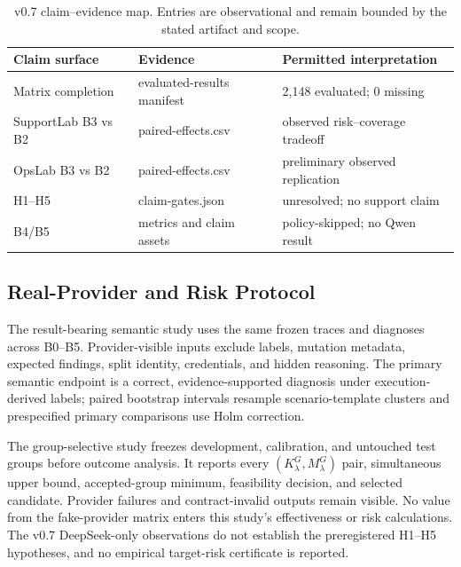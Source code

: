 \begin{table}[t]
    \caption{v0.7 claim--evidence map. Entries are observational and remain
    bounded by the stated artifact and scope.}
    \label{tab:claim-evidence-map}
    \centering
    \scriptsize
    \begin{tabular}{@{}p{}p{}p{}@{}}
        \toprule
        Claim surface & Evidence & Permitted interpretation \\
        \midrule
        Matrix completion & evaluated-results manifest & 2,148 evaluated; 0 missing \\
        SupportLab B3 vs B2 & paired-effects.csv & observed risk--coverage tradeoff \\
        OpsLab B3 vs B2 & paired-effects.csv & preliminary observed replication \\
        H1--H5 & claim-gates.json & unresolved; no support claim \\
        B4/B5 & metrics and claim assets & policy-skipped; no Qwen result \\
        \bottomrule
    \end{tabular}
\end{table}

\subsection{Real-Provider and Risk Protocol}

The result-bearing semantic study uses the same frozen traces and diagnoses
across B0--B5. Provider-visible inputs exclude labels, mutation metadata,
expected findings, split identity, credentials, and hidden reasoning. The
primary semantic endpoint is a correct, evidence-supported diagnosis under
execution-derived labels; paired bootstrap intervals resample scenario-template
clusters and prespecified primary comparisons use Holm correction.

The group-selective study freezes development, calibration, and untouched test
groups before outcome analysis. It reports every $(K_\lambda^G,M_\lambda^G)$
pair, simultaneous upper bound, accepted-group minimum, feasibility decision,
and selected candidate. Provider failures and contract-invalid outputs remain
visible. No value from the fake-provider matrix enters this study's
effectiveness or risk calculations. The v0.7 DeepSeek-only observations do not
establish the preregistered H1--H5 hypotheses, and no empirical target-risk
certificate is reported.
